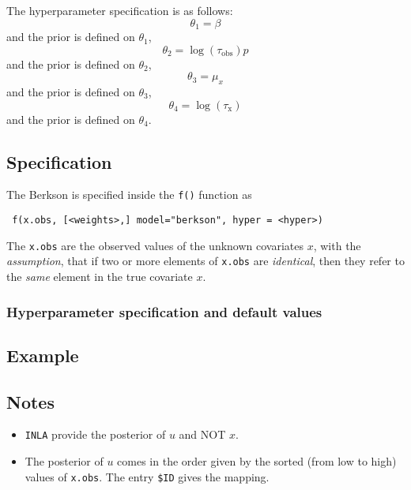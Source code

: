 \documentclass[a4paper,11pt]{article}
\begin{document}
The hyperparameter specification is as follows:
\begin{displaymath}
    \theta_{1} = \beta
\end{displaymath}
and the prior is defined on $\theta_{1}$,
\begin{displaymath}
    \theta_{2} = \log(\tau_{\text{obs}})
p\end{displaymath}
and the prior is defined on $\theta_{2}$,
\begin{displaymath}
    \theta_{3} = \mu_{x}
\end{displaymath}
and the prior is defined on $\theta_{3}$,
\begin{displaymath}
    \theta_{4} = \log(\tau_{\text{x}})
\end{displaymath}
and the prior is defined on $\theta_{4}$.


\subsection*{Specification}

The Berkson is specified inside the {\tt f()}
function as
\begin{verbatim}
 f(x.obs, [<weights>,] model="berkson", hyper = <hyper>)
\end{verbatim}
The \texttt{x.obs} are the observed values of the unknown covariates
$x$, with the \emph{assumption}, that if two or more elements of
\texttt{x.obs} are \emph{identical}, then they refer to the
\emph{same} element in the true covariate $x$.

\subsubsection*{Hyperparameter specification and default values}


\subsection*{Example}



\subsection*{Notes}

\begin{itemize}
\item \texttt{INLA} provide the posterior of $u$ and NOT $x$.
\item The posterior of $u$ comes in the order given by the sorted
    (from low to high) values of \texttt{x.obs}. The entry \verb|$ID|
    gives the mapping.
\end{itemize}
\end{document}
